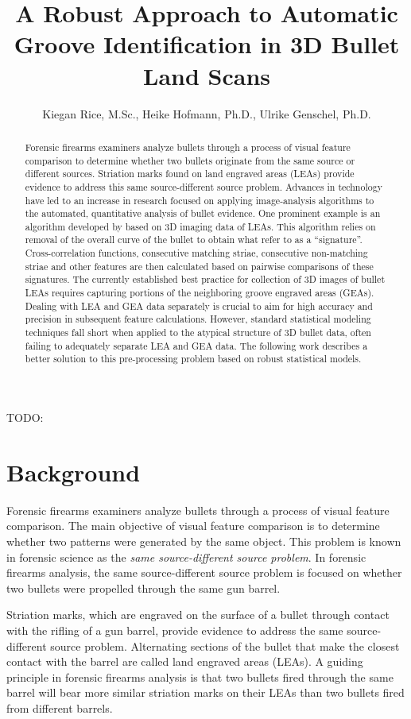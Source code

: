 \documentclass[]{article}
\title{A Robust Approach to Automatic Groove Identification in 3D Bullet Land
Scans}
\author{Kiegan Rice, M.Sc., Heike Hofmann, Ph.D., Ulrike Genschel, Ph.D.}
\date{}
\begin{document}
\maketitle
\begin{abstract}
Forensic firearms examiners analyze bullets through a process of visual
feature comparison to determine whether two bullets originate from the
same source or different sources. Striation marks found on land engraved
areas (LEAs) provide evidence to address this same source-different
source problem. Advances in technology have led to an increase in
research focused on applying image-analysis algorithms to the automated,
quantitative analysis of bullet evidence. One prominent example is an
algorithm developed by \citep{Hare1} based on 3D imaging data of LEAs.
This algorithm relies on removal of the overall curve of the bullet to
obtain what \citep{Hare1} refer to as a ``signature''. Cross-correlation
functions, consecutive matching striae, consecutive non-matching striae
and other features are then calculated based on pairwise comparisons of
these signatures. The currently established best practice for collection
of 3D images of bullet LEAs requires capturing portions of the
neighboring groove engraved areas (GEAs). Dealing with LEA and GEA data
separately is crucial to aim for high accuracy and precision in
subsequent feature calculations. However, standard statistical modeling
techniques fall short when applied to the atypical structure of 3D
bullet data, often failing to adequately separate LEA and GEA data. The
following work describes a better solution to this pre-processing
problem based on robust statistical models.
\end{abstract}

TODO:

\section{Background}

Forensic firearms examiners analyze bullets through a process of visual
feature comparison. The main objective of visual feature comparison is
to determine whether two patterns were generated by the same object.
This problem is known in forensic science as the \emph{same
source-different source problem}. In forensic firearms analysis, the
same source-different source problem is focused on whether two bullets
were propelled through the same gun barrel.

Striation marks, which are engraved on the surface of a bullet through
contact with the rifling of a gun barrel, provide evidence to address
the same source-different source problem. Alternating sections of the
bullet that make the closest contact with the barrel are called land
engraved areas (LEAs). A guiding principle in forensic firearms analysis
is that two bullets fired through the same barrel will bear more similar
striation marks on their LEAs than two bullets fired from different
barrels.
\end{document}
